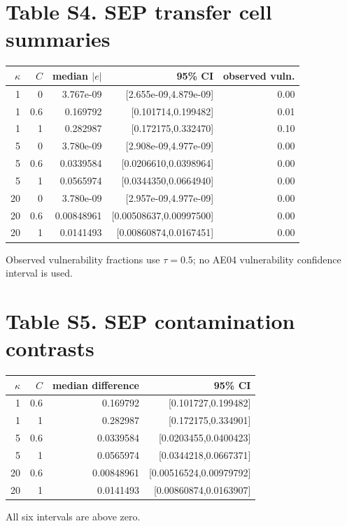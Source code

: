 \documentclass[9pt]{article}
\begin{document}
\section*{Table S4. SEP transfer cell summaries}
\begin{center}\small\begin{tabular}{rrrrr}\toprule $\kappa$&$C$&median $|e|$&95\% CI&observed vuln.\\\midrule
1&0&3.767e-09&[2.655e-09,4.879e-09]&0.00\\1&0.6&0.169792&[0.101714,0.199482]&0.01\\1&1&0.282987&[0.172175,0.332470]&0.10\\5&0&3.780e-09&[2.908e-09,4.977e-09]&0.00\\5&0.6&0.0339584&[0.0206610,0.0398964]&0.00\\5&1&0.0565974&[0.0344350,0.0664940]&0.00\\20&0&3.780e-09&[2.957e-09,4.977e-09]&0.00\\20&0.6&0.00848961&[0.00508637,0.00997500]&0.00\\20&1&0.0141493&[0.00860874,0.0167451]&0.00\\\bottomrule\end{tabular}\end{center}
Observed vulnerability fractions use $\tau=0.5$; no AE04 vulnerability confidence interval is used.
\section*{Table S5. SEP contamination contrasts}
\begin{center}\small\begin{tabular}{rrrr}\toprule $\kappa$&$C$&median difference&95\% CI\\\midrule
1&0.6&0.169792&[0.101727,0.199482]\\1&1&0.282987&[0.172175,0.334901]\\5&0.6&0.0339584&[0.0203455,0.0400423]\\5&1&0.0565974&[0.0344218,0.0667371]\\20&0.6&0.00848961&[0.00516524,0.00979792]\\20&1&0.0141493&[0.00860874,0.0163907]\\\bottomrule\end{tabular}\end{center}
All six intervals are above zero.
\end{document}
